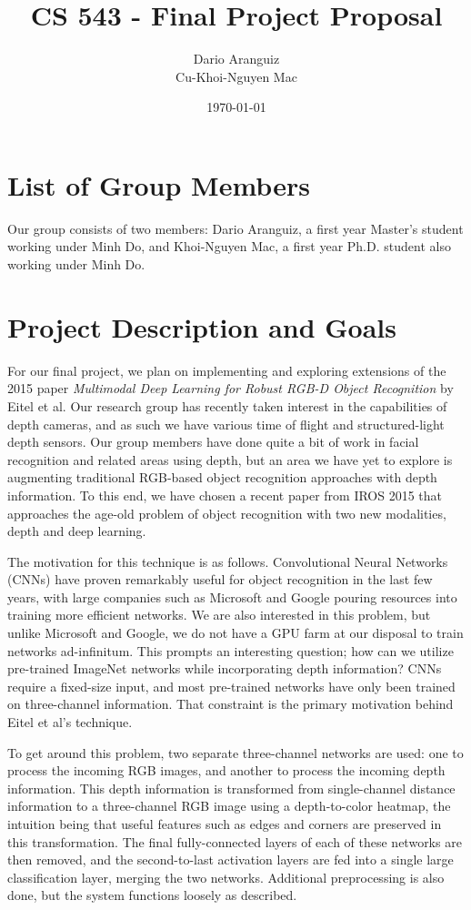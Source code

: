 \documentclass[paper=letter, fontsize=12pt]{article}
\title{CS 543 - Final Project Proposal}
\author{
        Dario Aranguiz \\
        Cu-Khoi-Nguyen Mac
        }
\date{\today}
\begin{document}
\maketitle

\section{List of Group Members}

Our group consists of two members: Dario Aranguiz, a first year Master's
student working under Minh Do, and Khoi-Nguyen Mac, a first year Ph.D. student
also working under Minh Do.


\section{Project Description and Goals}

For our final project, we plan on implementing and exploring extensions of the
2015 paper \textit{Multimodal Deep Learning for Robust RGB-D Object
Recognition} \cite{Eitel2015} by Eitel et al. Our research group has recently
taken interest in the capabilities of depth cameras, and as such we have
various time of flight and structured-light depth sensors. Our group members
have done quite a bit of work in facial recognition and related areas using
depth, but an area we have yet to explore is augmenting traditional RGB-based
object recognition approaches with depth information. To this end, we have
chosen a recent paper from IROS 2015 that approaches the age-old problem of
object recognition with two new modalities, depth and deep learning.

The motivation for this technique is as follows. Convolutional Neural Networks
(CNNs) have proven remarkably useful for object recognition in the last few
years, with large companies such as Microsoft and Google pouring resources
into training more efficient networks. We are also interested in this problem,
but unlike Microsoft and Google, we do not have a GPU farm at our disposal to
train networks ad-infinitum. This prompts an interesting question; how can we
utilize pre-trained ImageNet networks while incorporating depth information?
CNNs require a fixed-size input, and most pre-trained networks have only been
trained on three-channel information. That constraint is the primary
motivation behind Eitel et al's technique.

To get around this problem, two separate three-channel networks are used: one
to process the incoming RGB images, and another to process the incoming depth
information. This depth information is transformed from single-channel
distance information to a three-channel RGB image using a depth-to-color
heatmap, the intuition being that useful features such as edges and corners
are preserved in this transformation. The final fully-connected layers of each
of these networks are then removed, and the second-to-last activation layers
are fed into a single large classification layer, merging the two networks.
Additional preprocessing is also done, but the system functions loosely as
described.
\end{document}
